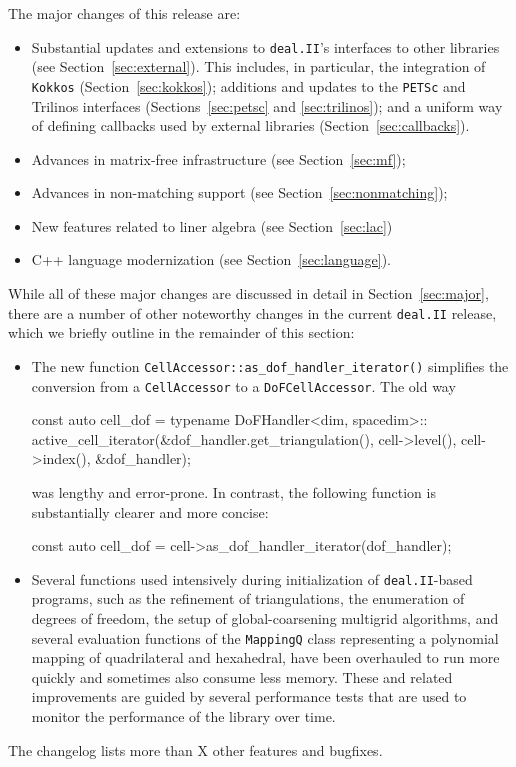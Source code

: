 \documentclass{ansarticle-preprint}
\newcommand{\specialword}[1]{\texttt{#1}}
\newcommand{\dealii}{{\specialword{deal.II}}\xspace}
\begin{document}
The major changes of this release are:
%
\begin{itemize}
  \item Substantial updates and extensions to \dealii{}'s interfaces
    to other libraries (see Section~\ref{sec:external}). This
    includes, in particular, the integration of \texttt{Kokkos} (Section~\ref{sec:kokkos});
    additions and updates to the \texttt{PETSc} and Trilinos
    interfaces
    (Sections~\ref{sec:petsc} and \ref{sec:trilinos}); and a uniform
    way of defining callbacks used by external libraries
    (Section~\ref{sec:callbacks}).
  \item Advances in matrix-free infrastructure (see Section~\ref{sec:mf});
  \item Advances in non-matching support (see Section~\ref{sec:nonmatching});
  \item New features related to liner algebra (see Section~\ref{sec:lac})
  \item C++ language modernization (see Section~\ref{sec:language}).
\end{itemize}
%

While all of these major changes are discussed in detail in
Section~\ref{sec:major}, there
are a number of other noteworthy changes in the current \dealii release,
which we briefly outline in the remainder of this section:
%
\begin{itemize}
  \item The new function \texttt{CellAccessor::as\_dof\_handler\_iterator()}
  simplifies the conversion from a \texttt{Cell\-Accessor} to a \texttt{DoF\-Cell\-Accessor}.
  The old way 
\begin{c++}
const auto cell_dof = typename DoFHandler<dim, spacedim>::
  active_cell_iterator(&dof_handler.get_triangulation(),
    cell->level(), cell->index(), &dof_handler);
\end{c++}
was lengthy and error-prone. In contrast, the following function is
substantially clearer and more concise:
\begin{c++}
const auto cell_dof = cell->as_dof_handler_iterator(dof_handler);
\end{c++}
\item Several functions used intensively during initialization of
  \dealii-based programs, such as the refinement of triangulations, the
  enumeration of degrees of freedom, the setup of global-coarsening multigrid
  algorithms, and several evaluation functions of the \texttt{MappingQ} class
  representing a polynomial mapping of quadrilateral and hexahedral, have been
  overhauled to run more quickly and sometimes also consume less memory. These
  and related improvements are guided by several performance tests that are
  used to monitor the performance of the library over time.
\end{itemize}
%
The changelog lists more than X other features and bugfixes.
\end{document}
